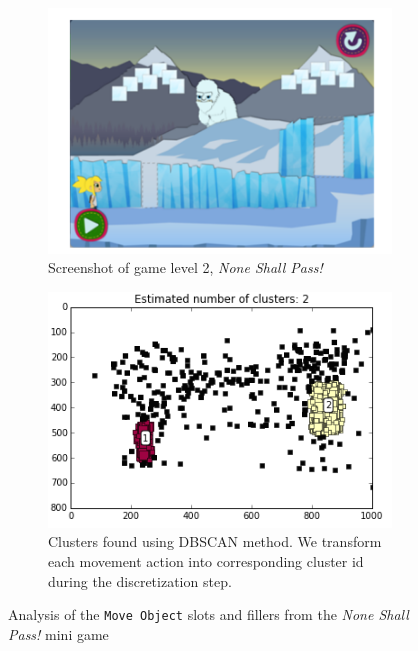\documentclass{sigchi}
\begin{document}
\begin{figure}[ht]
 \centering
\begin{subfigure}[t]{.5\textwidth}
	\centering
	\includegraphics[width=0.9\columnwidth]{figures/glacier_screenshot.png}
	\caption{Screenshot of game level 2, \textit {None Shall Pass!} \label{fig:screenshot}}
\end{subfigure}
\begin{subfigure}[t]{.5\textwidth}
	\centering
	\includegraphics[width=0.9\columnwidth]{figures/glacier_positions.png}
	\caption{Clusters found using DBSCAN method. We transform each movement action into corresponding cluster id during the discretization step. \label{fig:clustering}}
\end{subfigure}
\caption{Analysis of the  \texttt{Move Object} slots and fillers from the \textit{None Shall Pass!} mini game\label{fig:figurecluster}}
\end{figure}
\end{document}
